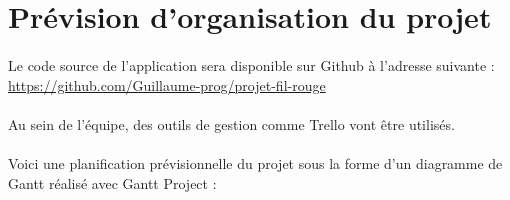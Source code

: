 \section{Prévision d'organisation du projet}
\paragraph{}
Le code source de l’application sera disponible sur Github à l’adresse suivante : \url{https://github.com/Guillaume-prog/projet-fil-rouge}

\paragraph{}
Au sein de l’équipe, des outils de gestion comme Trello vont être utilisés.

\paragraph{}
Voici une planification prévisionnelle du projet sous la forme d’un diagramme de Gantt réalisé avec Gantt Project  : 